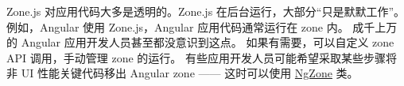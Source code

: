 
Zone.js 对应用代码大多是透明的。Zone.js 在后台运行，大部分“只是默默工作”。
例如，Angular 使用 Zone.js，Angular 应用代码通常运行在 zone 内。
成千上万的 Angular 应用开发人员甚至都没意识到这点。
如果有需要，可以自定义 zone API 调用，手动管理 zone 的运行。
有些应用开发人员可能希望采取某些步骤将非 UI 性能关键代码移出 Angular zone ——
这时可以使用 \href{https://next.angular.io/api/core/NgZone}{NgZone} 类。


